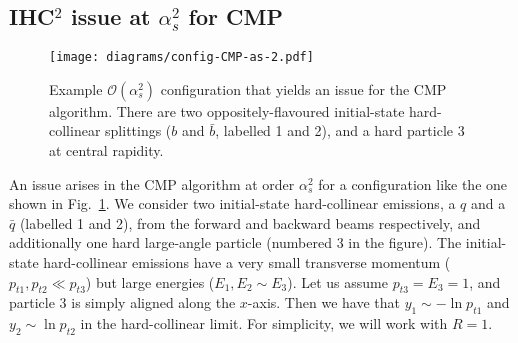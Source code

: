 \documentclass[nofootinbib,twocolumn,preprintnumbers,superscriptaddress,aps]{revtex4-2}
\newcommand{\as}{\alpha_s}
\begin{document}
\subsection{IHC$^2$ issue at $\as^2$ for CMP}
\label{sec:CMP-trouble-as2}

\begin{figure}[t]
  \centering
  \texttt{[image: diagrams/config-CMP-as-2.pdf]}
  \caption{
  \label{fig:config-CMP-as2}
  Example $\mathcal{O}(\as^2)$ configuration that yields an issue for the CMP algorithm.
  There are two oppositely-flavoured initial-state hard-collinear splittings ($b$ and $\bar b$, labelled 1 and 2), and a hard
  particle $3$ at central rapidity.
  }
\end{figure}

An issue arises in the CMP algorithm at order $\as^2$ for a configuration
like the one shown in Fig.~\ref{fig:config-CMP-as2}.
%
We consider two initial-state hard-collinear emissions, a $q$ and a
$\bar q$ (labelled 1 and 2), from the forward and backward beams
respectively, and additionally one hard large-angle particle (numbered 3 in the
figure).
%
The initial-state hard-collinear emissions have a very small transverse momentum
($p_{t1}, p_{t2} \ll p_{t3}$) but large energies ($E_1, E_2 \sim E_3$).
%
Let us assume $p_{t3} = E_3 = 1$, and particle $3$ is simply aligned
along the $x$-axis. Then we have that $y_1 \sim -\ln p_{t1}$
and $y_2 \sim \ln p_{t2}$ in the hard-collinear limit.
%
For simplicity, we will work with $R=1$.
\end{document}
